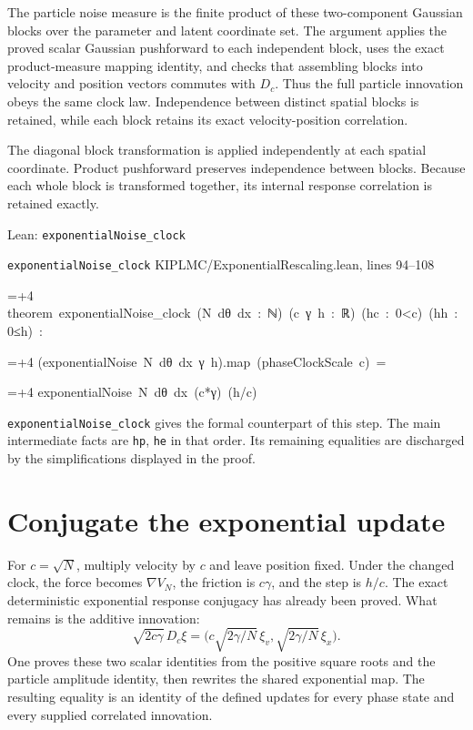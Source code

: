 \documentclass[11pt,a4paper]{article}
\newlength{\leancharwidth}
\newenvironment{leancode}{\par\smallskip\begingroup\ttfamily\footnotesize\raggedright
  \settowidth{\leancharwidth}{M}\setlength{\parskip}{0pt}\setlength{\parindent}{0pt}
  \frenchspacing}{\par\endgroup\smallskip}
\newcommand{\leanline}[2]{\hangindent=\dimexpr#1\leancharwidth+4\leancharwidth\relax
  \hangafter=1\noindent\hspace*{#1\leancharwidth}#2\par}
\newcommand{\leansource}[1]{\par{\footnotesize\color{leanmuted}#1}\par}
\newcommand{\leanlabel}[1]{\par\smallskip\noindent{\small\bfseries #1}\par}
\begin{document}
The particle noise measure is the finite product of these two-component Gaussian blocks over the parameter and latent coordinate set. The argument applies the proved scalar Gaussian pushforward to each independent block, uses the exact product-measure mapping identity, and checks that assembling blocks into velocity and position vectors commutes with \(D_c\). Thus the full particle innovation obeys the same clock law. Independence between distinct spatial blocks is retained, while each block retains its exact velocity-position correlation.



The diagonal block transformation is applied independently at each spatial coordinate. Product pushforward preserves independence between blocks. Because each whole block is transformed together, its internal response correlation is retained exactly.

\begin{leanbox}{Lean: \texttt{exponentialNoise\_\allowbreak{}clock}}
\leansource{\texttt{exponentialNoise\_\allowbreak{}clock} \quad KIPLMC/\allowbreak{}ExponentialRescaling.lean, lines 94–108}
\begin{leancode}
\leanline{0}{theorem\ exponentialNoise\_clock\ (N\ dθ\ dx\ :\ ℕ)\ (c\ γ\ h\ :\ ℝ)\ (hc\ :\ 0<c)\ (hh\ :\ 0≤h)\ :}
\leanline{4}{(exponentialNoise\ N\ dθ\ dx\ γ\ h).map\ (phaseClockScale\ c)\ =}
\leanline{6}{exponentialNoise\ N\ dθ\ dx\ (c*γ)\ (h/c)}
\end{leancode}
\leanlabel{How the Lean proof follows the argument}
\texttt{exponential\allowbreak{}Noise\_\allowbreak{}clock} gives the formal counterpart of this step. The main intermediate facts are \texttt{hp}, \texttt{he} in that order. Its remaining equalities are discharged by the simplifications displayed in the proof.
\end{leanbox}

\section{\texorpdfstring{Conjugate the exponential update}{Conjugate the exponential update}}


For \(c=\sqrt N\), multiply velocity by \(c\) and leave position fixed. Under the changed clock, the force becomes \(\nabla V_N\), the friction is \(c\gamma\), and the step is \(h/c\). The exact deterministic exponential response conjugacy has already been proved. What remains is the additive innovation: \[\sqrt{2c\gamma}\,D_c\xi=\bigl(c\sqrt{2\gamma/N}\,\xi_v,\sqrt{2\gamma/N}\,\xi_x\bigr).\] One proves these two scalar identities from the positive square roots and the particle amplitude identity, then rewrites the shared exponential map. The resulting equality is an identity of the defined updates for every phase state and every supplied correlated innovation.
\end{document}
